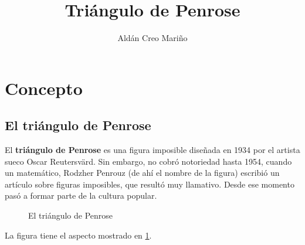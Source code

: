 \documentclass[a4paper,12pt]{article}
\title{Triángulo de Penrose}
\date{}
\author{Aldán Creo Mariño}
\begin{document}
\maketitle

\newpage
\tableofcontents
\newpage

\section{Concepto}
\subsection{El triángulo de Penrose}

El \textbf{triángulo de Penrose} es una figura imposible diseñada en 1934 por el artista sueco Oscar Reutersvärd. Sin embargo, no cobró notoriedad hasta 1954, cuando un matemático, Rodzher Penrouz (de ahí el nombre de la figura) escribió un artículo sobre figuras imposibles, que resultó muy llamativo. Desde ese momento pasó a formar parte de la cultura popular.

\begin{figure}
    \centering
    \caption{El triángulo de Penrose} \label{imagen_triangulo}
\end{figure}

La figura tiene el aspecto mostrado en \ref{imagen_triangulo}.
\end{document}
